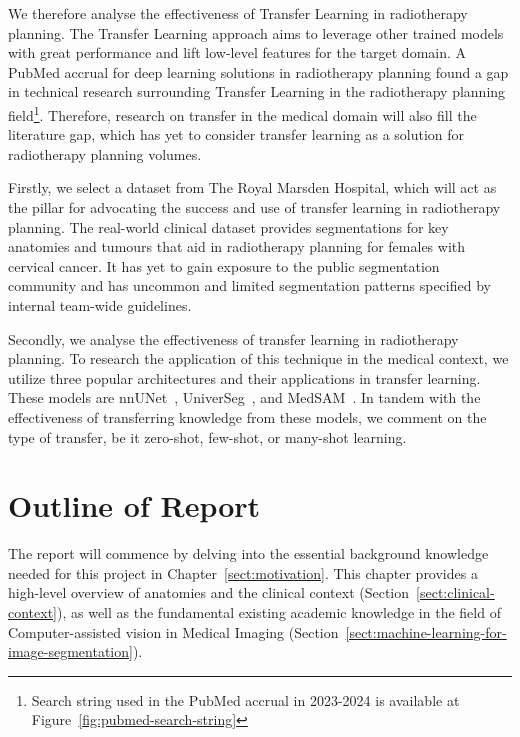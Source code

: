 \documentclass[11pt,twoside]{report}
\begin{document}
We therefore analyse the effectiveness of Transfer Learning in radiotherapy planning. The Transfer Learning approach aims to leverage other trained models with great performance and lift low-level features for the target domain. A PubMed accrual for deep learning solutions in radiotherapy planning found a gap in technical research surrounding Transfer Learning in the radiotherapy planning field\footnote{Search string used in the PubMed accrual in 2023-2024 is available at Figure~\ref{fig:pubmed-search-string}}. Therefore, research on transfer in the medical domain will also fill the literature gap, which has yet to consider transfer learning as a solution for radiotherapy planning volumes. 

Firstly, we select a dataset from The Royal Marsden Hospital, which will act as the pillar for advocating the success and use of transfer learning in radiotherapy planning. The real-world clinical dataset provides segmentations for key anatomies and tumours that aid in radiotherapy planning for females with cervical cancer. It has yet to gain exposure to the public segmentation community and has uncommon and limited segmentation patterns specified by internal team-wide guidelines.

Secondly, we analyse the effectiveness of transfer learning in radiotherapy planning. To research the application of this technique in the medical context, we utilize three popular architectures and their applications in transfer learning. These models are nnUNet~\cite{nnunet}, UniverSeg~\cite{universeg}, and MedSAM~\cite{Ma2024}. In tandem with the effectiveness of transferring knowledge from these models, we comment on the type of transfer, be it zero-shot, few-shot, or many-shot learning.


\section{Outline of Report}

The report will commence by delving into the essential background knowledge needed for this project in Chapter~\ref{sect:motivation}. This chapter provides a high-level overview of anatomies and the clinical context (Section~\ref{sect:clinical-context}), as well as the fundamental existing academic knowledge in the field of Computer-assisted vision in Medical Imaging (Section~\ref{sect:machine-learning-for-image-segmentation}).
\end{document}
